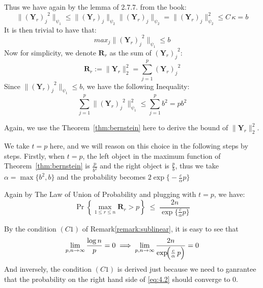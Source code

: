 \documentclass{beamer}
\theoremstyle{remark}
\begin{document}
\begin{frame}
Thus we have again by the lemma of 2.7.7. from the book\cite{vershynin2018high}:
\[
  \|{(\mathbf{Y}_{r})_{j}}^{2}\|_{\psi_{1}} \le \|(\mathbf{Y}_{r})_{j}\|_{\psi_{2}}\|(\mathbf{Y}_{r})_{j}\|_{\psi_{2}} = \|(\mathbf{Y}_{r})_{j}\|_{\psi_{2}}^{2} \le C\,\kappa = b
  \] 
It is then trivial to have that:
\[
max_j \|{(\mathbf{Y}_{r})_{j}}^{2}\|_{\psi_{1}} \le b
\]
Now for simplicity, we denote $\mathbf{R}_r$ as the sum of ${(\mathbf{Y}_{r})_{j}}^{2}$:
\[
\mathbf{R}_r := \|\mathbf{Y}_r\|_2^2 = \sum_{j=1}^p {(\mathbf{Y}_{r})_{j}}^2
\]
Since $\|{(\mathbf{Y}_{r})_{j}}^{2}\|_{\psi_{1}} \le b$, we have the following Inequality:
\[
  \sum_{j=1}^p \|{(\mathbf{Y}_{r})_{j}}^{2}\|_{\psi_{1}}^{2} \le \sum_{j=1}^p b^{2} = pb^{2}
\]
\end{frame}
\begin{frame}
Again, we use the Theorem~\ref{thm:bernstein} here to derive the bound of $\|\mathbf{Y}_r\|_2^2$.

We take $t = p$ here, and we will reason on this choice in the following steps by steps. Firstly, when $t = p$, the left object in the maximum function of Theorem~\ref{thm:bernstein} is $\frac{p}{b^2}$ and the right object is $\frac{p}{b}$, thus we take $\alpha = \max\bigl\{b^2,b\bigr\}$ and the probability becomes $2\exp\bigl\{-\frac{c}{\alpha} p\bigr\}$

Again by The Law of Union of Probability and plugging with $t = p$, we have:
\[
  \Pr{\left\{\max_{1\le r\le n} \mathbf{R}_r > p\right\}} \;\le\; \frac{2 n}{\exp\bigl\{\frac{c}{\alpha} p\bigr\}} \tag{4.2}\label{eq:4.2}
\]

By the condition $(C1)$ of Remark\ref{remark:sublinear}, it is easy to see that 
\[
\lim_{p,n \to \infty} \frac{\log n}{p} = 0 \implies  \lim_{p,n \to \infty} \frac{2n}{\exp\!\Bigl(\frac{c}{\alpha}\,p\Bigr)} = 0
\]
And inversely, the condition $(C1)$ is derived just because we need to ganrantee that the probability on the right hand side of \ref{eq:4.2} should converge to 0.
\end{frame}
\end{document}
